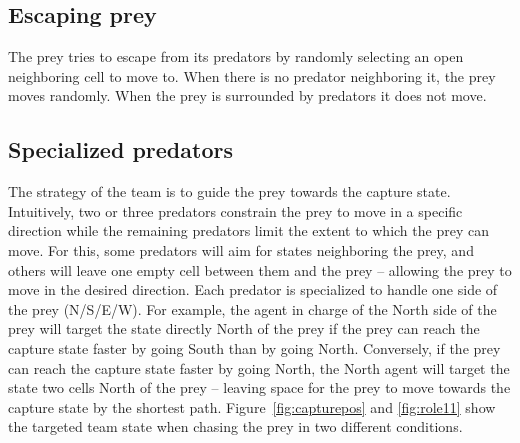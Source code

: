 \subsection{Escaping prey}

The prey tries to escape from its predators by randomly selecting an open neighboring cell to move to. When there is no predator neighboring it, the prey moves randomly. When the prey is surrounded by predators it does not move.


\subsection{Specialized predators}

The strategy of the team is to guide the prey towards the capture state. Intuitively, two or three predators constrain the prey to move in a specific direction while the remaining predators limit the extent to which the prey can move. For this, some predators will aim for states neighboring the prey, and others will leave one empty cell between them and the prey -- allowing the prey to move in the desired direction. Each predator is specialized to handle one side of the prey (N/S/E/W). For example, the agent in charge of the North side of the prey will target the state directly North of the prey if the prey can reach the capture state faster by going South than by going North. Conversely, if the prey can reach the capture state faster by going North, the North agent will target the state two cells North of the prey -- leaving space for the prey to move towards the capture state by the shortest path. Figure~\ref{fig:capturepos} and \ref{fig:role11} show the targeted team state when chasing the prey in two different conditions.


